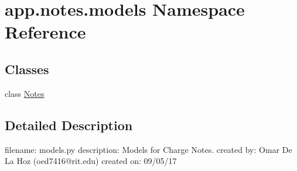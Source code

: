 \hypertarget{namespaceapp_1_1notes_1_1models}{}\section{app.\+notes.\+models Namespace Reference}
\label{namespaceapp_1_1notes_1_1models}
\subsection*{Classes}
\begin{DoxyCompactItemize}
\item 
class \mbox{\hyperlink{classapp_1_1notes_1_1models_1_1_notes}{Notes}}
\end{DoxyCompactItemize}


\subsection{Detailed Description}
\begin{DoxyVerb}filename: models.py
description: Models for Charge Notes.
created by: Omar De La Hoz (oed7416@rit.edu)
created on: 09/05/17
\end{DoxyVerb}
 
